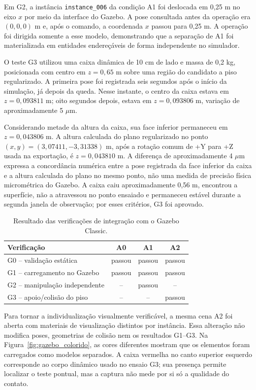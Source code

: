 Em G2, a instância \texttt{instance\_006} da condição A1 foi deslocada em 0,25 m no eixo $x$ por meio da interface do Gazebo. A pose consultada antes da operação era $(0,0,0)$ m e, após o comando, a coordenada $x$ passou para 0,25 m. A operação foi dirigida somente a esse modelo, demonstrando que a separação de A1 foi materializada em entidades endereçáveis de forma independente no simulador.

O teste G3 utilizou uma caixa dinâmica de 10 cm de lado e massa de 0,2 kg, posicionada com centro em $z=0,65$ m sobre uma região do candidato a piso regularizado. A primeira pose foi registrada seis segundos após o início da simulação, já depois da queda. Nesse instante, o centro da caixa estava em $z=0,093811$ m; oito segundos depois, estava em $z=0,093806$ m, variação de aproximadamente 5 $\mu$m.

Considerando metade da altura da caixa, sua face inferior permaneceu em $z=0,043806$ m. A altura calculada do plano regularizado no ponto $(x,y)=(3,07411,-3,31338)$ m, após a rotação comum de +Y para +Z usada na exportação, é $z=0,043810$ m. A diferença de aproximadamente 4 $\mu$m expressa a concordância numérica entre a pose registrada da face inferior da caixa e a altura calculada do plano no mesmo ponto, não uma medida de precisão física micrométrica do Gazebo. A caixa caiu aproximadamente 0,56 m, encontrou a superfície, não a atravessou no ponto ensaiado e permaneceu estável durante a segunda janela de observação; por esses critérios, G3 foi aprovado.

\begin{table}[H]
\centering
\caption{Resultado das verificações de integração com o Gazebo Classic.}
\label{tab:gates}
\begin{tabularx}{\textwidth}{>{\raggedright\arraybackslash}X c c c}
\toprule
\textbf{Verificação} & \textbf{A0} & \textbf{A1} & \textbf{A2} \\
\midrule
G0 -- validação estática & passou & passou & passou \\
G1 -- carregamento no Gazebo & passou & passou & passou \\
G2 -- manipulação independente & -- & passou & -- \\
G3 -- apoio/colisão do piso & -- & -- & passou \\
\bottomrule
\end{tabularx}
\end{table}

Para tornar a individualização visualmente verificável, a mesma cena A2 foi aberta com materiais de visualização distintos por instância. Essa alteração não modifica poses, geometrias de colisão nem os resultados G1--G3. Na Figura~\ref{fig:gazebo_colorido}, as cores diferentes mostram que os elementos foram carregados como modelos separados. A caixa vermelha no canto superior esquerdo corresponde ao corpo dinâmico usado no ensaio G3; sua presença permite localizar o teste pontual, mas a captura não mede por si só a qualidade do contato.

